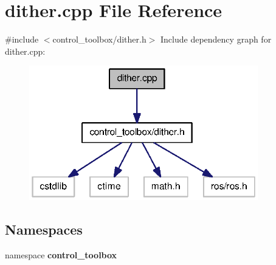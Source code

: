 \section{dither.\-cpp \-File \-Reference}
\label{dither_8cpp}
{\ttfamily \#include $<$control\-\_\-toolbox/dither.\-h$>$}\*
\-Include dependency graph for dither.\-cpp\-:
\nopagebreak
\begin{figure}[H]
\begin{center}
\leavevmode
\includegraphics[width=282pt]{dither_8cpp__incl}
\end{center}
\end{figure}
\subsection*{\-Namespaces}
\begin{DoxyCompactItemize}
\item 
namespace {\bf control\-\_\-toolbox}
\end{DoxyCompactItemize}
